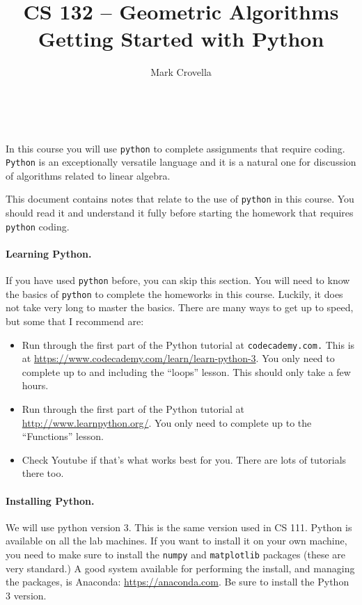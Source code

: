 \documentclass{article}
\begin{document}
\title{CS 132 -- Geometric Algorithms\\[0.25\baselineskip]Getting
  Started with Python}
\author{Mark Crovella}
\date{~}
\maketitle
\thispagestyle{empty}

In this course you will use \texttt{python} to complete assignments that require coding.   \texttt{Python} is an exceptionally versatile language and it is a natural one for discussion of algorithms related to linear algebra.

This document contains notes that relate to the use of \texttt{python} in this course.   You should read it and understand it fully before starting the homework that requires \texttt{python} coding.

\paragraph{Learning Python.}   If you have used \texttt{python} before, you can skip this section.   You will need to know the basics of \texttt{python} to complete the homeworks in this course.   Luckily, it does not take very long to master the basics.   There are many ways to get up to speed, but some that I recommend are:
\begin{itemize}
\item Run through the first part of the Python tutorial at \texttt{codecademy.com.}   This is at \url{https://www.codecademy.com/learn/learn-python-3}.   You only need to complete up to and including the ``loops'' lesson.   This should only take a few hours.
\item Run through the first part of the Python tutorial at \url{http://www.learnpython.org/}.   You only need to complete up to the ``Functions'' lesson.
\item Check Youtube if that's what works best for you.  There are lots of tutorials there too.
\end{itemize}

\paragraph{Installing Python.}  We will use python version 3.  This is
the same version used in CS 111.  Python is available on all the lab
machines.  If you want to install it on your own machine, you need to
make sure to install the \texttt{numpy} and \texttt{matplotlib} packages
(these are very standard.)  A good system available for performing the
install, and managing the packages, is Anaconda:
\url{https://anaconda.com}.   Be sure to install
the Python 3 version. 
\end{document}

